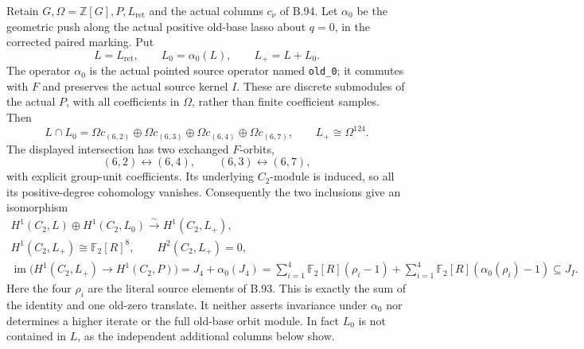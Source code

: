 \label{stmt:B95}
Retain $G,\Omega=\mathbb Z[G],P,L_{\mathrm{ret}}$ and the actual
columns $c_\nu$ of B.94. Let $\alpha_0$ be the geometric push along
the actual positive old-base lasso about $q=0$, in the corrected paired
marking. Put
\[
 L=L_{\mathrm{ret}},\qquad L_0=\alpha_0(L),\qquad L_+=L+L_0.
\]
The operator $\alpha_0$ is the actual pointed source operator named
\texttt{old\_0}; it commutes with $F$ and preserves the actual source
kernel $I$. These are discrete submodules of the actual $P$, with all
coefficients in $\Omega$, rather than finite coefficient samples.
Then
\begin{equation}\label{eq:B95-intersection}
 L\cap L_0=
   \Omega c_{(6,2)}\oplus\Omega c_{(6,3)}
     \oplus\Omega c_{(6,4)}\oplus\Omega c_{(6,7)},
 \qquad L_+\cong\Omega^{124}.
\end{equation}
The displayed intersection has two exchanged $F$-orbits,
\[
       (6,2)\longleftrightarrow(6,4),\qquad
       (6,3)\longleftrightarrow(6,7),
\]
with explicit group-unit coefficients. Its underlying $C_2$-module is
induced, so all its positive-degree cohomology vanishes. Consequently
the two inclusions give an isomorphism
\begin{equation}\label{eq:B95-cohomology}
 \begin{gathered}
 H^1(C_2,L)\oplus H^1(C_2,L_0)
       \xrightarrow{\sim}H^1(C_2,L_+),\\
 H^1(C_2,L_+)\cong\mathbb F_2[R]^8,
 \qquad H^2(C_2,L_+)=0,\\
 \operatorname{im}\bigl(H^1(C_2,L_+)\longrightarrow H^1(C_2,P)\bigr)
       =J_4+\alpha_0(J_4)
       =\sum_{i=1}^4\mathbb F_2[R](\rho_i-1)
         +\sum_{i=1}^4\mathbb F_2[R](\alpha_0(\rho_i)-1)
       \subseteq J_I.
 \end{gathered}
\end{equation}
Here the four $\rho_i$ are the literal source elements of B.93.
This is exactly the sum of the identity and one old-zero translate.
It neither asserts invariance under $\alpha_0$ nor determines a higher
iterate or the full old-base orbit module. In fact $L_0$ is not contained
in $L$, as the independent additional columns below show.

